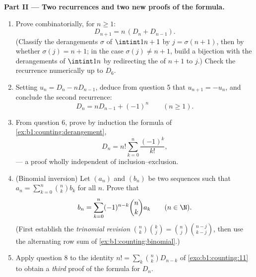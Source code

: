 \begin{problem}
\medskip
\noindent\textbf{Part II --- Two recurrences and two new proofs of
the formula.}
\begin{enumerate}[resume]
  \item Prove combinatorially, for $n \geq 1$:
        \[
        D_{n+1} = n\,(D_n + D_{n-1}) .
        \]
        (Classify the derangements $\sigma$ of $\intint1{n+1}$ by
        $j = \sigma(n+1)$, then by whether $\sigma(j) = n + 1$; in
        the case $\sigma(j) \neq n+1$, build a bijection with the
        derangements of $\intint1n$ by redirecting the  of
        $n + 1$ to $j$.) Check the recurrence numerically up to
        $D_6$.
  \item Setting $u_n = D_n - n D_{n-1}$, deduce from question 5
        that $u_{n+1} = -u_n$, and conclude the second recurrence:
        \[
        D_n = n D_{n-1} + (-1)^n \qquad (n \geq 1).
        \]
  \item From question 6, prove by induction the formula of
        \cref{ex:b1:counting:derangement},
        \[
        D_n = n! \sum_{k=0}^{n} \frac{(-1)^k}{k!},
        \]
        --- a proof wholly independent of inclusion--exclusion.
  \item (Binomial inversion) Let $(a_n)$ and $(b_n)$ be two
        sequences such that $a_n = \sum_{k=0}^n \binom nk b_k$ for
        all $n$. Prove that
        \[
        b_n = \sum_{k=0}^{n} (-1)^{n-k} \binom nk a_k
        \qquad (n \in \N).
        \]
        (First establish the \emph{trinomial revision}
        $\binom nk \binom kj = \binom nj \binom{n-j}{k-j}$, then
        use the alternating row sum of
        \cref{ex:b1:counting:binomial}.)
  \item Apply question 8 to the identity $n! = \sum_k \binom nk
        D_{n-k}$ of \cref{exo:b1:counting:11} to obtain a
        \emph{third} proof of the formula for $D_n$.
\end{enumerate}


\end{problem}
